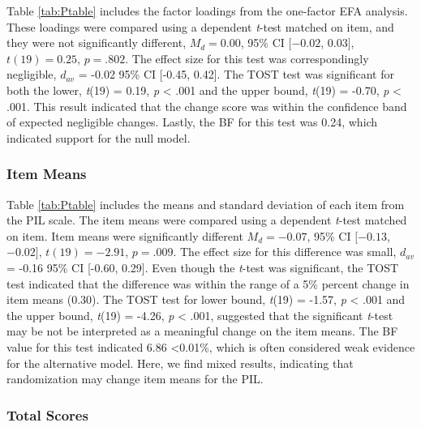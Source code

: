 \documentclass[english,man, mask]{apa6}
\theoremstyle{definition}
\theoremstyle{definition}
\theoremstyle{definition}
\theoremstyle{remark}
\begin{document}
Table \ref{tab:Ptable} includes the factor loadings from the one-factor
EFA analysis. These loadings were compared using a dependent
\emph{t}-test matched on item, and they were not significantly
different, \(M_d = 0.00\), 95\% CI \([-0.02\), \(0.03]\),
\(t(19) = 0.25\), \(p = .802\). The effect size for this test was
correspondingly negligible, \(d_{av}\) = -0.02 95\% CI {[}-0.45,
0.42{]}. The TOST test was significant for both the lower, \emph{t}(19)
= 0.19, \emph{p} \textless{} .001 and the upper bound, \emph{t}(19) =
-0.70, \emph{p} \textless{} .001. This result indicated that the change
score was within the confidence band of expected negligible changes.
Lastly, the BF for this test was 0.24, which indicated support for the
null model.

\subsubsection{Item Means}\label{item-means}

Table \ref{tab:Ptable} includes the means and standard deviation of each
item from the PIL scale. The item means were compared using a dependent
\emph{t}-test matched on item. Item means were significantly different
\(M_d = -0.07\), 95\% CI \([-0.13\), \(-0.02]\), \(t(19) = -2.91\),
\(p = .009\). The effect size for this difference was small, \(d_{av}\)
= -0.16 95\% CI {[}-0.60, 0.29{]}. Even though the \emph{t}-test was
significant, the TOST test indicated that the difference was within the
range of a 5\% percent change in item means (0.30). The TOST test for
lower bound, \emph{t}(19) = -1.57, \emph{p} \textless{} .001 and the
upper bound, \emph{t}(19) = -4.26, \emph{p} \textless{} .001, suggested
that the significant \emph{t}-test may be not be interpreted as a
meaningful change on the item means. The BF value for this test
indicated 6.86 \textless{}0.01\%, which is often considered weak
evidence for the alternative model. Here, we find mixed results,
indicating that randomization may change item means for the PIL.

\subsubsection{Total Scores}\label{total-scores}
\end{document}
